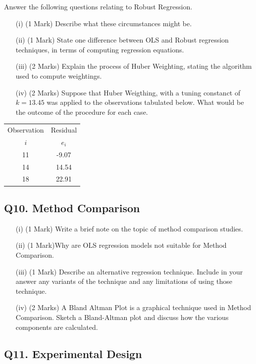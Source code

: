 \documentclass[a4paper,12pt]{article}
\begin{document}
Answer the following questions relating to Robust Regression. 

\begin{itemize}
	\item[(i)] (1 Mark) Describe what these circumstances might be.
	\item[(ii)] (1 Mark) State one difference between OLS and Robust regression techniques, in terms of computing regression equations.
	\item[(iii)] (2 Marks) Explain the process of Huber Weighting, stating the algorithm used to compute weightings.
	\item[(iv)] (2 Marks) Suppose that Huber Weigthing, with a tuning constanct of $k=13.45$ was applied to the observations 
	tabulated below. What would be the outcome of the procedure for each case. 
\end{itemize}
\begin{center}
	\begin{tabular}{|c|c|}
		\hline
		Observation & Residual \\ 
		$i$  & $e_i$ \\ \hline
		11 & -9.07 \\ \hline 
		14 & 14.54 \\ \hline
		18 & 22.91 \\ \hline
	\end{tabular} 
\end{center}

\subsection*{Q10. Method Comparison}
\begin{itemize}
	\item[(i)] (1 Mark) Write a brief note on the topic of method comparison studies.
	\item[(ii)] (1 Mark)Why are OLS regression models not suitable for Method Comparison.
	\item[(iii)] (1 Mark) Describe an alternative regression technique. Include in your answer any variants of the technique and any limitations of using those technique.
	
	\item[(iv)] (2 Marks) A Bland Altman Plot is a graphical technique used in Method Comparison. Sketch a Bland-Altman plot and discuss how the various components are calculated.
\end{itemize}
\subsection*{Q11. Experimental Design }
\end{document}

